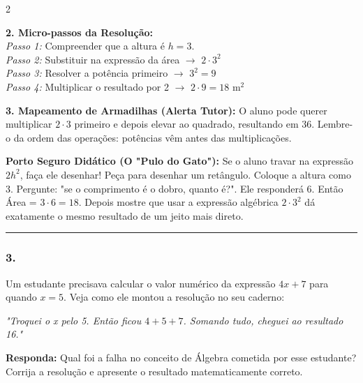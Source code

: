 \begin{multicols*}{2}
\begin{tcolorbox}[colback=CorTitUm!5, colframe=CorTitUm, boxrule=1pt, arc=4pt, left=6pt, right=6pt, top=6pt, bottom=6pt]
    \textbf{2. Micro-passos da Resolução:}\\
    \textit{Passo 1:} Compreender que a altura é $h=3$.\\
    \textit{Passo 2:} Substituir na expressão da área $\rightarrow$ $ 2 \cdot 3^2 $\\
    \textit{Passo 3:} Resolver a potência primeiro $\rightarrow$ $ 3^2 = 9 $\\
    \textit{Passo 4:} Multiplicar o resultado por 2 $\rightarrow$ $ 2 \cdot 9 = 18 \text{ m}^2 $\par\vspace{0.1cm}
    
    \textbf{3. Mapeamento de Armadilhas (Alerta Tutor):} O aluno pode querer multiplicar $2 \cdot 3$ primeiro e depois elevar ao quadrado, resultando em $36$. Lembre-o da ordem das operações: potências vêm antes das multiplicações.
    \end{tcolorbox}
    \vspace{0.15cm}
    
    \begin{boxexplicacao}
    \textbf{Porto Seguro Didático (O "Pulo do Gato"):} Se o aluno travar na expressão $2h^2$, faça ele desenhar! Peça para desenhar um retângulo. Coloque a altura como 3. Pergunte: "se o comprimento é o dobro, quanto é?". Ele responderá 6. Então Área = $3 \cdot 6 = 18$. Depois mostre que usar a expressão algébrica $2 \cdot 3^2$ dá exatamente o mesmo resultado de um jeito mais direto.
    \end{boxexplicacao}
\fi

\par\vspace{\espacoQuestao}

\noindent\textcolor{CorLinha}{\rule{\linewidth}{0.5pt}}
\par\vspace{\espacoPreQuestao}
\subsubsection*{3.} 
\begin{enunciadoLiteral}
Um estudante precisava calcular o valor numérico da expressão $ 4x + 7 $ para quando $ x = 5 $. Veja como ele montou a resolução no seu caderno:

\textit{"Troquei o x pelo 5. Então ficou $ 4 + 5 + 7 $. Somando tudo, cheguei ao resultado 16."}

\begin{boxresponda}
\textbf{Responda:} Qual foi a falha no conceito de Álgebra cometida por esse estudante? Corrija a resolução e apresente o resultado matematicamente correto.
\end{boxresponda}
\end{enunciadoLiteral}


\end{multicols*}
